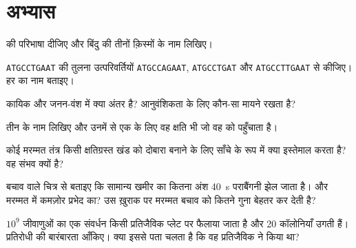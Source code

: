 \section{अभ्यास}

\begin{exercise}[$\star$]\label{exo:g11:mutations:1}
 की परिभाषा दीजिए और बिंदु  की तीनों क़िस्मों के नाम
लिखिए।
\end{exercise}

\begin{exercise}[$\star$]\label{exo:g11:mutations:2}
\texttt{ATGCCTGAAT} की तुलना उत्परिवर्तियों \texttt{ATGCCAGAAT},
\texttt{ATGCCTGAT} और \texttt{ATGCCTTGAAT} से कीजिए। हर  का
नाम बताइए।
\end{exercise}

\begin{exercise}[$\star$]\label{exo:g11:mutations:3}
कायिक और जनन-वंश  में क्या अंतर है? आनुवंशिकता के लिए कौन-सा
मायने रखता है?
\end{exercise}

\begin{exercise}[$\star$]\label{exo:g11:mutations:4}
तीन  के नाम लिखिए और उनमें से एक के लिए वह क्षति भी जो वह
 को पहुँचाता है।
\end{exercise}

\begin{exercise}[$\star$]\label{exo:g11:mutations:5}
कोई मरम्मत तंत्र किसी क्षतिग्रस्त खंड को दोबारा बनाने के लिए साँचे के रूप
में क्या इस्तेमाल करता है? वह संभव क्यों है?
\end{exercise}

\begin{exercise}[$\star\star$]\label{exo:g11:mutations:6}
बचाव वाले चित्र से बताइए कि सामान्य खमीर का कितना अंश \qty{40}{s}
पराबैंगनी झेल जाता है। और मरम्मत में कमज़ोर प्रभेद का? उस ख़ुराक पर
मरम्मत बचाव को कितने गुना बेहतर कर देती है?
\end{exercise}

\begin{exercise}[$\star\star$]\label{exo:g11:mutations:7}
$10^9$ जीवाणुओं का एक संवर्धन किसी प्रतिजैविक प्लेट पर फैलाया जाता है और
20 कॉलोनियाँ उगती हैं। प्रतिरोधी  की बारंबारता आँकिए। क्या इससे
पता चलता है कि वह  प्रतिजैविक ने किया था?
\end{exercise}

